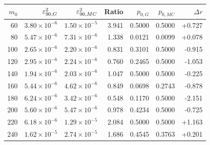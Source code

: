 \begin{tabular}{rrrrrrr}
\toprule
$m_0$ & $\varepsilon^2_{90,G}$ & $\varepsilon^2_{90,MC}$ & Ratio & $p_{0,G}$ & $p_{0,MC}$ & $\Delta r$ \\
\midrule
60 & $3.80\times10^{-6}$ & $1.50\times10^{-5}$ & 3.941 & 0.5000 & 0.5000 & +0.727 \\
80 & $5.47\times10^{-6}$ & $7.31\times10^{-6}$ & 1.338 & 0.0121 & 0.0099 & +0.078 \\
100 & $2.65\times10^{-6}$ & $2.20\times10^{-6}$ & 0.831 & 0.3101 & 0.5000 & -0.915 \\
120 & $2.95\times10^{-6}$ & $2.24\times10^{-6}$ & 0.760 & 0.2465 & 0.5000 & -1.053 \\
140 & $1.94\times10^{-6}$ & $2.03\times10^{-6}$ & 1.047 & 0.5000 & 0.5000 & -0.225 \\
160 & $5.44\times10^{-6}$ & $4.62\times10^{-6}$ & 0.849 & 0.0698 & 0.2743 & -0.878 \\
180 & $6.24\times10^{-6}$ & $3.42\times10^{-6}$ & 0.548 & 0.1170 & 0.5000 & -2.151 \\
200 & $5.60\times10^{-6}$ & $5.47\times10^{-6}$ & 0.978 & 0.4234 & 0.5000 & -0.725 \\
220 & $6.18\times10^{-6}$ & $1.29\times10^{-5}$ & 2.084 & 0.5000 & 0.5000 & +1.163 \\
240 & $1.62\times10^{-5}$ & $2.74\times10^{-5}$ & 1.686 & 0.4545 & 0.3763 & +0.201 \\
\bottomrule
\end{tabular}
